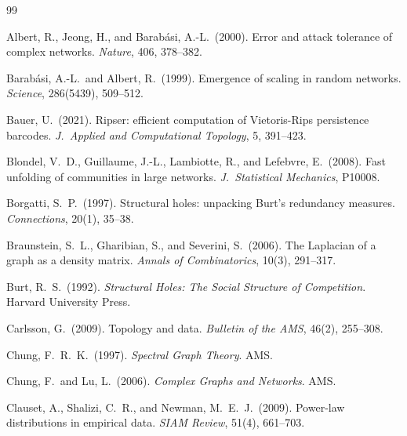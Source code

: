 \documentclass[11pt,a4paper]{article}
\begin{document}


\begin{thebibliography}{99}

Albert, R., Jeong, H., and Barabási, A.-L.\ (2000).
\newblock Error and attack tolerance of complex networks.
\newblock \emph{Nature}, 406, 378--382.

Barabási, A.-L.\ and Albert, R.\ (1999).
\newblock Emergence of scaling in random networks.
\newblock \emph{Science}, 286(5439), 509--512.

Bauer, U.\ (2021).
\newblock Ripser: efficient computation of Vietoris-Rips persistence barcodes.
\newblock \emph{J.\ Applied and Computational Topology}, 5, 391--423.

Blondel, V.~D., Guillaume, J.-L., Lambiotte, R., and Lefebvre, E.\ (2008).
\newblock Fast unfolding of communities in large networks.
\newblock \emph{J.\ Statistical Mechanics}, P10008.

Borgatti, S.~P.\ (1997).
\newblock Structural holes: unpacking Burt's redundancy measures.
\newblock \emph{Connections}, 20(1), 35--38.

Braunstein, S.~L., Gharibian, S., and Severini, S.\ (2006).
\newblock The Laplacian of a graph as a density matrix.
\newblock \emph{Annals of Combinatorics}, 10(3), 291--317.

Burt, R.~S.\ (1992).
\newblock \emph{Structural Holes: The Social Structure of Competition}.
\newblock Harvard University Press.

Carlsson, G.\ (2009).
\newblock Topology and data.
\newblock \emph{Bulletin of the AMS}, 46(2), 255--308.

Chung, F.~R.~K.\ (1997).
\newblock \emph{Spectral Graph Theory}.
\newblock AMS.

Chung, F.\ and Lu, L.\ (2006).
\newblock \emph{Complex Graphs and Networks}.
\newblock AMS.

Clauset, A., Shalizi, C.~R., and Newman, M.~E.~J.\ (2009).
\newblock Power-law distributions in empirical data.
\newblock \emph{SIAM Review}, 51(4), 661--703.


\end{thebibliography}
\end{document}
